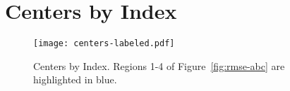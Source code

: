 \chapter{Centers by Index}\label{app:centers-index}
\vspace{-3em}
\begin{figure}[H]
    \texttt{[image: centers-labeled.pdf]}
    \caption[Centers by Index]{Centers by Index. Regions 1-4 of Figure~\ref{fig:rmse-abc} are highlighted in blue.}
\end{figure}

